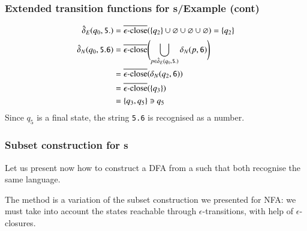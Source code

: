 %
\begin{frame}[containsverbatim]
\frametitle{Extended transition functions for {\eNFA}s/Example (cont)}

\begin{align*}
   \hat{\delta}_E (q_0, \mathtt{5.})
&= \overline{\epsilon\text{-close}} (\{q_2\} \cup \varnothing \cup \varnothing \cup
   \varnothing)
 = \{q_2\}\\
   \hat{\delta}_N (q_0, \mathtt{5.6})
&= \overline{\epsilon\text{-close}} \Biggl( \bigcup_{p \in \hat{\delta}_E (q_0,
     \mathtt{5.})}{\delta_N (p, \mathtt{6})} \Biggr)\\
&= \overline{\epsilon\text{-close}} (\delta_N (q_2, \mathtt{6}))\\
&= \overline{\epsilon\text{-close}} (\{q_3\})\\
&= \{q_3, q_5\} \ni q_5
\end{align*}
Since \(q_5\) is a final state, the string \verb+5.6+ is recognised as
a number.

\end{frame}

%
\begin{frame}
\frametitle{Subset construction for {\eNFA}s}

Let us present now how to construct a DFA from a \eNFA such that both
recognise the same language.

\bigskip

The method is a variation of the subset construction we presented for
NFA: we must take into account the states reachable through
\(\epsilon\)-transitions, with help of \(\epsilon\)-closures.

\end{frame}

